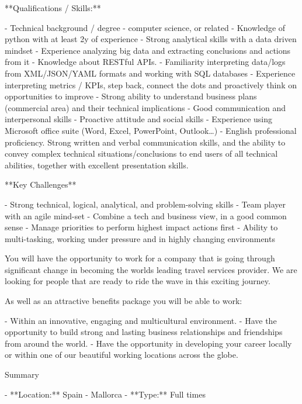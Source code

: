   **Qualifications / Skills:**

  - Technical background / degree - computer science, or related
  - Knowledge of python with at least 2y of experience
  - Strong analytical skills with a data driven mindset
  - Experience analyzing big data and extracting conclusions and actions from it
  - Knowledge about RESTful APIs.
  - Familiarity interpreting data/logs from XML/JSON/YAML formats and working with SQL databases
  - Experience interpreting metrics / KPIs, step back, connect the dots and proactively think on opportunities to improve
  - Strong ability to understand business plans (commercial area) and their technical implications
  - Good communication and interpersonal skills
  - Proactive attitude and social skills
  - Experience using Microsoft office suite (Word, Excel, PowerPoint, Outlook…)
  - English professional proficiency. Strong written and verbal communication skills, and the ability to convey complex technical situations/conclusions to end users of all technical abilities, together with excellent presentation skills.

  **Key Challenges**

  - Strong technical, logical, analytical, and problem-solving skills
  - Team player with an agile mind-set
  - Combine a tech and business view, in a good common sense
  - Manage priorities to perform highest impact actions first
  - Ability to multi-tasking, working under pressure and in highly changing environments

  You will have the opportunity to work for a company that is going through significant change in becoming the worlds leading travel services provider. We are looking for people that are ready to ride the wave in this exciting journey.

  As well as an attractive benefits package you will be able to work: 

  - Within an innovative, engaging and multicultural environment.
  - Have the opportunity to build strong and lasting business relationships and friendships from around the world.
  - Have the opportunity in developing your career locally or within one of our beautiful working locations across the globe. 

  Summary

  - **Location:** Spain - Mallorca
  - **Type:** Full times
